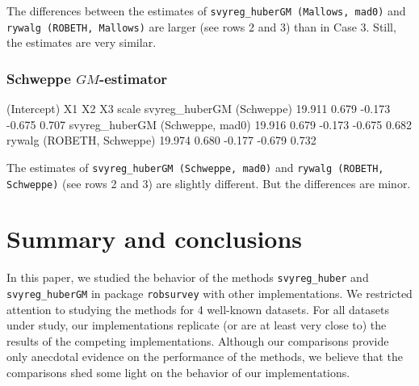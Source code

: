 \documentclass[a4paper,oneside,11pt,DIV=12]{scrartcl}
\newcommand{\code}[1]{{\texttt{#1}}}
\begin{document}
\noindent The differences between the estimates of
\code{svyreg\_huberGM (Mallows, mad0)} and \code{rywalg (ROBETH, Mallows)}
are larger (see rows 2 and 3) than in Case 3. Still, the estimates are
very similar.

\subsubsection{Schweppe $GM$-estimator}

\begin{Schunk}
\begin{Soutput}
                                (Intercept)    X1     X2     X3 scale
svyreg_huberGM (Schweppe)            19.911 0.679 -0.173 -0.675 0.707
svyreg_huberGM (Schweppe, mad0)      19.916 0.679 -0.173 -0.675 0.682
rywalg (ROBETH, Schweppe)            19.974 0.680 -0.177 -0.679 0.732
\end{Soutput}
\end{Schunk}

\noindent The estimates of \code{svyreg\_huberGM (Schweppe, mad0)} and
\code{rywalg (ROBETH, Schweppe)} (see rows 2 and 3) are slightly
different. But the differences are minor.


\section{Summary and conclusions}\label{sec:summary}
In this paper, we studied the behavior of the methods \code{svyreg\_huber}
and \code{svyreg\_huberGM} in package \code{robsurvey} with other
implementations. We restricted attention to studying the methods for
4 well-known datasets. For all datasets under study, our implementations
replicate (or are at least very close to) the results of the competing
implementations. Although our comparisons provide only anecdotal evidence
on the performance of the methods, we believe that the comparisons shed
some light on the behavior of our implementations.

\end{document}
